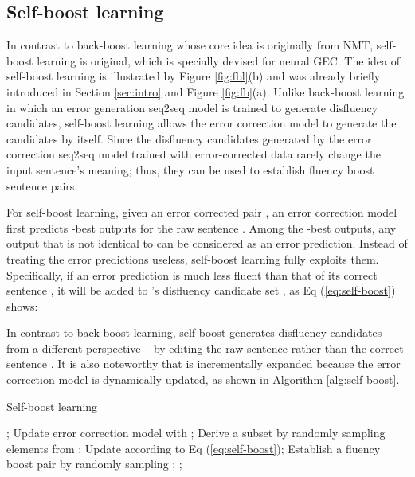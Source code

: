 \documentclass{article} \usepackage{MSRA_TR,times}
\begin{document}
\subsection{Self-boost learning}\label{subsec:selfboost}

In contrast to back-boost learning whose core idea is originally from NMT, self-boost learning is original, which is specially devised for neural GEC. The idea of self-boost learning is illustrated by Figure \ref{fig:fbl}(b) and was already briefly introduced in Section \ref{sec:intro} and Figure \ref{fig:fb}(a). Unlike back-boost learning in which an error generation seq2seq model is trained to generate disfluency candidates, self-boost learning allows the error correction model to generate the candidates by itself. Since the disfluency candidates generated by the error correction seq2seq model trained with error-corrected data rarely change the input sentence's meaning; thus, they can be used to establish fluency boost sentence pairs.

For self-boost learning, given an error corrected pair , an error correction model  first predicts -best outputs  for the raw sentence . Among the -best outputs, any output that is not identical to  can be considered as an error prediction. Instead of treating the error predictions useless, self-boost learning fully exploits them. Specifically, if an error prediction  is much less fluent than that of its correct sentence , it will be added to 's disfluency candidate set , as Eq (\ref{eq:self-boost}) shows:

\vspace{-0.5cm}

\vspace{-0.4cm}



In contrast to back-boost learning, self-boost generates disfluency candidates from a different perspective -- by editing the raw sentence  rather than the correct sentence . It is also noteworthy that  is incrementally expanded because the error correction model  is dynamically updated,
as shown in Algorithm \ref{alg:self-boost}. 


\begin{algorithm}[h]
\centering
\caption{Self-boost learning\label{alg:self-boost}}
\begin{algorithmic}[1]
\State ;
\EndFor
\State 
{}
\State Update error correction model  with ;
\State 
\State Derive a subset  by randomly sampling  elements from ; 
\State Update  according to Eq (\ref{eq:self-boost});
\State Establish a fluency boost pair  by randomly sampling ;
\State ;
\EndFor
\EndFor
\end{algorithmic}
\end{algorithm}
\end{document}
